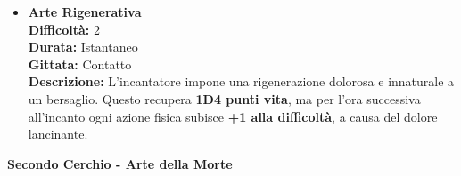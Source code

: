 \documentclass[./magie.tex]{subfiles}
\begin{document}
\begin{itemize}
\vspace{0.5cm}\rule{\textwidth}{0.4pt}\vspace{1cm}

\item \textbf{Arte Rigenerativa} \\
\textbf{Difficoltà:} 2 \\
\textbf{Durata:} Istantaneo \\
\textbf{Gittata:} Contatto \\
\textbf{Descrizione:} L'incantatore impone una rigenerazione dolorosa e innaturale a un bersaglio. Questo recupera \textbf{1D4 punti vita}, ma per l'ora successiva all'incanto ogni azione fisica subisce \textbf{+1 alla difficoltà}, a causa del dolore lancinante.

\end{itemize}

\clearpage
\vspace{0.2cm}
{\zarafirtitlefont\Large\bfseries Secondo Cerchio - Arte della Morte}
\end{document}
